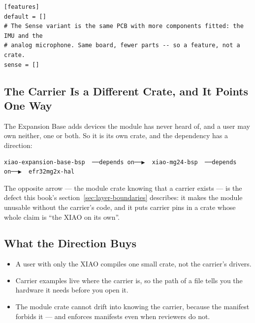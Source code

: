 \begin{verbatim}
[features]
default = []
# The Sense variant is the same PCB with more components fitted: the IMU and the
# analog microphone. Same board, fewer parts -- so a feature, not a crate.
sense = []
\end{verbatim}

\subsection{The Carrier Is a Different Crate, and It Points One Way}

The Expansion Base adds devices the module has never heard of, and a user may own neither, one or both.
So it is its own crate, and the dependency has a direction:

\begin{verbatim}
xiao-expansion-base-bsp  ──depends on──▶  xiao-mg24-bsp  ──depends on──▶  efr32mg2x-hal
\end{verbatim}

The opposite arrow — the module crate knowing that a carrier exists — is the defect this book's
section~\ref{sec:layer-boundaries} describes: it makes the module unusable without the carrier's code,
and it puts carrier pins in a crate whose whole claim is ``the XIAO on its own''.

\subsection{What the Direction Buys}

\begin{itemize}
    \item A user with only the XIAO compiles one small crate, not the carrier's drivers.
    \item Carrier examples live where the carrier is, so the path of a file tells you the hardware it
          needs before you open it.
    \item The module crate cannot drift into knowing the carrier, because the manifest forbids it —
          and  enforces manifests even when reviewers do not.
\end{itemize}
